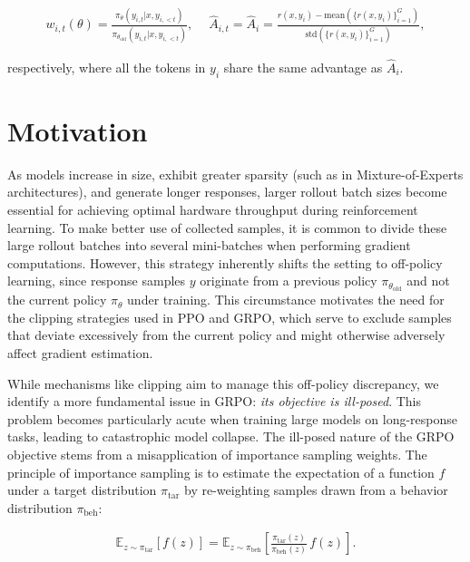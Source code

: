 \begin{align}
    w_{i,t}(\theta)=\frac{ \pi_{\theta} (y_{i,t} | x, y_{i,<t}) }{ \pi_{\theta_\text{old}} (y_{i,t} | x,y_{i,<t})},\quad\ 
    \widehat{A}_{i,t} = \widehat{A}_{i} = \frac{r(x, y_i) - \mathrm{mean} \left( \{ r(x, y_i) \}_{i=1}^G \right) }{ \mathrm{std} \left( \{ r(x, y_i) \}_{i=1}^G \right) },
\end{align}

respectively, where all the tokens in $y_i$ share the same advantage as $\widehat{A}_{i}$.

\section{Motivation}
\label{sec:motivation}

As models increase in size, exhibit greater sparsity (such as in Mixture-of-Experts architectures), and generate longer responses, larger rollout batch sizes become essential for achieving optimal hardware throughput during reinforcement learning. To make better use of collected samples, it is common to divide these large rollout batches into several mini-batches when performing gradient computations. However, this strategy inherently shifts the setting to off-policy learning, since response samples $y$ originate from a previous policy $\pi_{\theta_\text{old}}$ and not the current policy $\pi_\theta$ under training. This circumstance motivates the need for the clipping strategies used in PPO and GRPO, which serve to exclude samples that deviate excessively from the current policy and might otherwise adversely affect gradient estimation.

While mechanisms like clipping aim to manage this off-policy discrepancy, we identify a more fundamental issue in GRPO: \textit{its objective is ill-posed}. This problem becomes particularly acute when training large models on long-response tasks, leading to catastrophic model collapse. The ill-posed nature of the GRPO objective stems from a misapplication of importance sampling weights. The principle of importance sampling is to estimate the expectation of a function $f$ under a target distribution $\pi_\text{tar}$ by re-weighting samples drawn from a behavior distribution $\pi_\text{beh}$:

\begin{align}
\mathbb{E}_{z \sim \pi_\text{tar}} \left[ f(z) \right] = \mathbb{E}_{z \sim \pi_\text{beh}} \left[ \frac{ \pi_\text{tar} (z) }{ \pi_\text{beh} (z)} \, f(z) \right].
\end{align}


